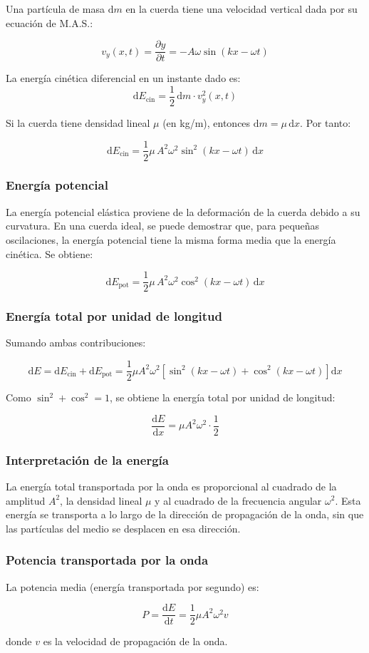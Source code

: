 Una partícula de masa \(\mathrm{d}m\) en la cuerda tiene una velocidad vertical dada por su ecuación de M.A.S.:

\[
v_y(x,t) = \frac{\partial y}{\partial t} = -A \omega \sin(kx - \omega t)
\]

La energía cinética diferencial en un instante dado es:
\[
\mathrm{d}E_{\text{cin}} = \frac{1}{2} \, \mathrm{d}m \cdot v_y^2(x,t)
\]

Si la cuerda tiene densidad lineal \(\mu\) (en kg/m), entonces \(\mathrm{d}m = \mu \, \mathrm{d}x\). Por tanto:

\[
\mathrm{d}E_{\text{cin}} = \frac{1}{2} \mu \, A^2 \omega^2 \sin^2(kx - \omega t) \, \mathrm{d}x
\]

\subsubsection{Energía potencial}

La energía potencial elástica proviene de la deformación de la cuerda debido a su curvatura. En una cuerda ideal, se puede demostrar que, para pequeñas oscilaciones, la energía potencial tiene la misma forma media que la energía cinética. Se obtiene:

\[
\mathrm{d}E_{\text{pot}} = \frac{1}{2} \mu \, A^2 \omega^2 \cos^2(kx - \omega t) \, \mathrm{d}x
\]

\subsubsection{Energía total por unidad de longitud}

Sumando ambas contribuciones:

\[
\mathrm{d}E = \mathrm{d}E_{\text{cin}} + \mathrm{d}E_{\text{pot}} = \frac{1}{2} \mu A^2 \omega^2 \left[ \sin^2(kx - \omega t) + \cos^2(kx - \omega t) \right] \mathrm{d}x
\]

Como \(\sin^2 + \cos^2 = 1\), se obtiene la energía total por unidad de longitud:

\[
\frac{\mathrm{d}E}{\mathrm{d}x} = \mu A^2 \omega^2 \cdot \frac{1}{2}
\]


\subsubsection{Interpretación de la energía}

La energía total transportada por la onda es proporcional al cuadrado de la amplitud \(A^2\), la densidad lineal \(\mu\) y al cuadrado de la frecuencia angular \(\omega^2\). Esta energía se transporta a lo largo de la dirección de propagación de la onda, sin que las partículas del medio se desplacen en esa dirección.

\subsubsection{Potencia transportada por la onda}

La potencia media (energía transportada por segundo) es:

\[
P = \frac{\mathrm{d}E}{\mathrm{d}t} = \frac{1}{2} \mu A^2 \omega^2 v
\]

donde \(v\) es la velocidad de propagación de la onda.
